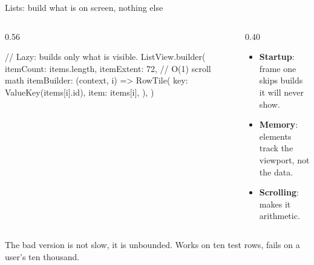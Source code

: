 \documentclass[10pt,aspectratio=169,t]{beamer}
\begin{document}
\begin{frame}[fragile,eyebrow=Optimization]{Lists: build what is on screen, nothing else}
  \begin{columns}[T]
    \begin{column}{0.56\textwidth}
\begin{dart}
// Lazy: builds only what is visible.
ListView.builder(
  itemCount: items.length,
  itemExtent: 72,      // O(1) scroll math
  itemBuilder: (context, i) => RowTile(
    key: ValueKey(items[i].id),
    item: items[i],
  ),
)
\end{dart}
    \end{column}
    \begin{column}{0.40\textwidth}
      \begin{itemize}
        \item \textbf{Startup}: frame one skips builds it will never show.
        \item \textbf{Memory}: elements track the viewport, not the data.
        \item \textbf{Scrolling}:  makes it arithmetic.
      \end{itemize}
    \end{column}
  \end{columns}
  \begin{takeaway}{The bad version is not slow, it is unbounded.}
    Works on ten test rows, fails on a user's ten thousand.
  \end{takeaway}
\end{frame}
\end{document}
